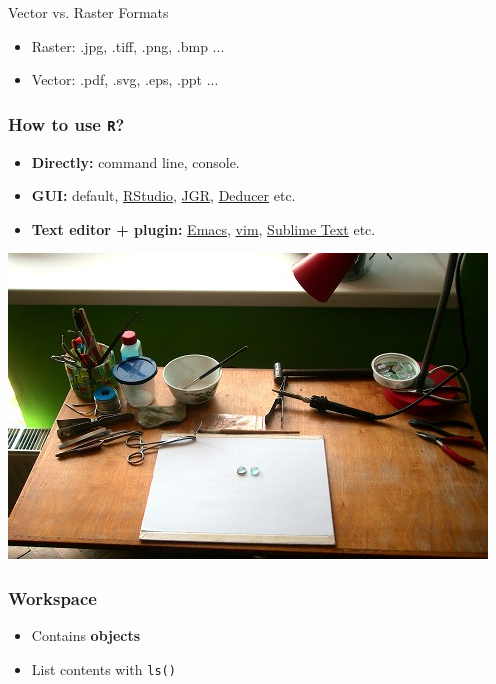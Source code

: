 \documentclass[20pt]{beamer}
\begin{document}
\begin{frame}{Vector vs. Raster Formats}
	\begin{itemize}
		\item 	{\color{DG}Raster:} .jpg, .tiff, .png, .bmp ...
		\item	{\color{DG}Vector:} .pdf, .svg, .eps, .ppt ...
	\end{itemize}
\end{frame}



\begin{frame}
	\frametitle{How to use \texttt{R}?}
	\begin{itemize}
		\item 	{\bf{\color{DO}Directly:}} command line, console.
		\item	{\bf{\color{DO}GUI:}} default, \href{http://www.rstudio.com/}{RStudio}, \href{http://rforge.net/JGR/}{JGR}, \href{http://www.deducer.org/}{Deducer} etc.
		\item 	{\bf{\color{DO}Text editor + plugin:}}  \href{http://ess.r-project.org/}{Emacs}, \href{http://www.vim.org/scripts/script.php?script_id=2628}{vim}, \href{http://kevjohnson.org/using-r-in-sublime-text-3/}{Sublime Text} etc.
	\end{itemize}
\end{frame}


\begin{frame}
	\vspace*{-1mm}
	\hspace*{-12mm}
	\href{http://www.fler.cz/files/u/5/1/u5113/DSCN9921aaa.jpg}{\includegraphics[height=1.1\textheight]{DSCN9921aaa.jpg}}
\end{frame}


\begin{frame}
	\frametitle{Workspace}
	\begin{itemize}
		\item 	Contains {\bf{\color{DG}objects}}
		\item 	List contents with {\tt ls()}
	\end{itemize}
\end{frame}
\end{document}
